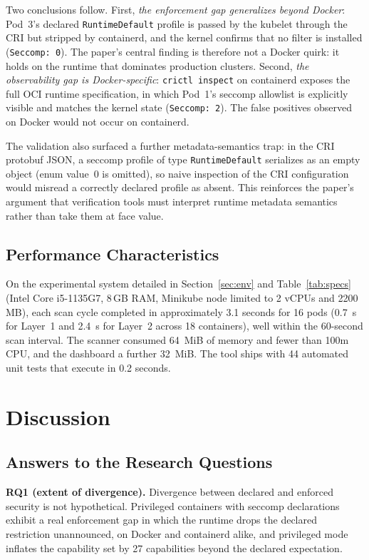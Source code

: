 \documentclass[sigconf]{acmart}
\begin{document}
Two conclusions follow. First, \emph{the enforcement gap generalizes beyond Docker}: Pod~3's declared \texttt{RuntimeDefault} profile is passed by the kubelet through the CRI but stripped by containerd, and the kernel confirms that no filter is installed (\texttt{Seccomp:~0}). The paper's central finding is therefore not a Docker quirk: it holds on the runtime that dominates production clusters. Second, \emph{the observability gap is Docker-specific}: \texttt{crictl inspect} on containerd exposes the full OCI runtime specification, in which Pod~1's seccomp allowlist is explicitly visible and matches the kernel state (\texttt{Seccomp:~2}). The false positives observed on Docker would not occur on containerd.

The validation also surfaced a further metadata-semantics trap: in the CRI protobuf JSON, a seccomp profile of type \texttt{RuntimeDefault} serializes as an empty object (enum value~0 is omitted), so naive inspection of the CRI configuration would misread a correctly declared profile as absent. This reinforces the paper's argument that verification tools must interpret runtime metadata semantics rather than take them at face value.

\subsection{Performance Characteristics}

On the experimental system detailed in Section~\ref{sec:env} and Table~\ref{tab:specs} (Intel Core i5-1135G7, 8\,GB RAM, Minikube node limited to 2 vCPUs and 2200\,MB), each scan cycle completed in approximately 3.1 seconds for 16 pods (0.7~s for Layer~1 and 2.4~s for Layer~2 across 18 containers), well within the 60-second scan interval. The scanner consumed 64~MiB of memory and fewer than 100m CPU, and the dashboard a further 32~MiB. The tool ships with 44 automated unit tests that execute in 0.2 seconds.

\section{Discussion}

\subsection{Answers to the Research Questions}

\textbf{RQ1 (extent of divergence).} Divergence between declared and enforced security is not hypothetical. Privileged containers with seccomp declarations exhibit a real enforcement gap in which the runtime drops the declared restriction unannounced, on Docker and containerd alike, and privileged mode inflates the capability set by 27 capabilities beyond the declared expectation.
\end{document}
